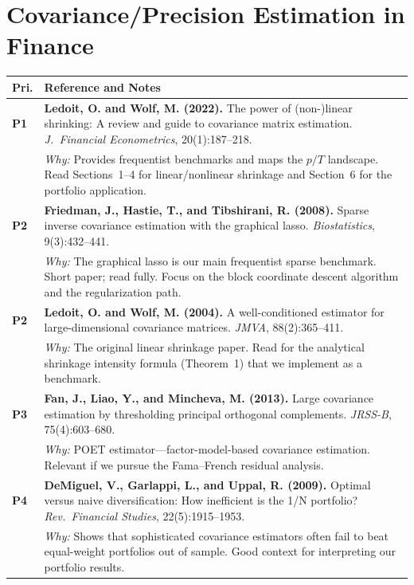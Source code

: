 \documentclass[11pt,a4paper]{article}
\begin{document}
\section{Covariance/Precision Estimation in Finance}

\begin{longtable}{@{}p{}p{}@{}}
\toprule
\textbf{Pri.} & \textbf{Reference and Notes} \\
\midrule
\endhead

\textcolor{P1}{\textbf{P1}} &
\textbf{Ledoit, O. and Wolf, M. (2022).} The power of (non-)linear shrinking: A review and guide to covariance matrix estimation. \textit{J.\ Financial Econometrics}, 20(1):187--218. \\
& \textit{Why:} Provides frequentist benchmarks and maps the $p/T$ landscape. Read Sections~1--4 for linear/nonlinear shrinkage and Section~6 for the portfolio application. \\[0.8em]

\textcolor{P2}{\textbf{P2}} &
\textbf{Friedman, J., Hastie, T., and Tibshirani, R. (2008).} Sparse inverse covariance estimation with the graphical lasso. \textit{Biostatistics}, 9(3):432--441. \\
& \textit{Why:} The graphical lasso is our main frequentist sparse benchmark. Short paper; read fully. Focus on the block coordinate descent algorithm and the regularization path. \\[0.8em]

\textcolor{P2}{\textbf{P2}} &
\textbf{Ledoit, O. and Wolf, M. (2004).} A well-conditioned estimator for large-dimensional covariance matrices. \textit{JMVA}, 88(2):365--411. \\
& \textit{Why:} The original linear shrinkage paper. Read for the analytical shrinkage intensity formula (Theorem~1) that we implement as a benchmark. \\[0.8em]

\textcolor{P3}{\textbf{P3}} &
\textbf{Fan, J., Liao, Y., and Mincheva, M. (2013).} Large covariance estimation by thresholding principal orthogonal complements. \textit{JRSS-B}, 75(4):603--680. \\
& \textit{Why:} POET estimator---factor-model-based covariance estimation. Relevant if we pursue the Fama--French residual analysis. \\[0.8em]

\textcolor{P4}{\textbf{P4}} &
\textbf{DeMiguel, V., Garlappi, L., and Uppal, R. (2009).} Optimal versus naive diversification: How inefficient is the 1/N portfolio? \textit{Rev.\ Financial Studies}, 22(5):1915--1953. \\
& \textit{Why:} Shows that sophisticated covariance estimators often fail to beat equal-weight portfolios out of sample. Good context for interpreting our portfolio results. \\

\bottomrule
\end{longtable}
\end{document}
